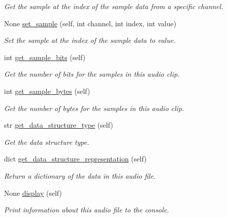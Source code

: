 \begin{DoxyCompactItemize}
\begin{DoxyCompactList}\small\item\em Get the sample at the index of the sample data from a specific channel. \end{DoxyCompactList}\item 
None \mbox{\hyperlink{classbridges_1_1audio__clip_1_1_audio_clip_ae449cf0de308423987bef3ff6b85c50f}{set\+\_\+sample}} (self, int channel, int index, int value)
\begin{DoxyCompactList}\small\item\em Set the sample at the index of the sample data to value. \end{DoxyCompactList}\item 
int \mbox{\hyperlink{classbridges_1_1audio__clip_1_1_audio_clip_a42961560a55008ba85d956f124728984}{get\+\_\+sample\+\_\+bits}} (self)
\begin{DoxyCompactList}\small\item\em Get the number of bits for the samples in this audio clip. \end{DoxyCompactList}\item 
int \mbox{\hyperlink{classbridges_1_1audio__clip_1_1_audio_clip_ab63866904ac833bdcf8b669b90008a64}{get\+\_\+sample\+\_\+bytes}} (self)
\begin{DoxyCompactList}\small\item\em Get the number of bytes for the samples in this audio clip. \end{DoxyCompactList}\item 
str \mbox{\hyperlink{classbridges_1_1audio__clip_1_1_audio_clip_a258ddac138761543fa0ad27496025b12}{get\+\_\+data\+\_\+structure\+\_\+type}} (self)
\begin{DoxyCompactList}\small\item\em Get the data structure type. \end{DoxyCompactList}\item 
dict \mbox{\hyperlink{classbridges_1_1audio__clip_1_1_audio_clip_afed6c31ac64c4dbd892cce7b5abb8ba9}{get\+\_\+data\+\_\+structure\+\_\+representation}} (self)
\begin{DoxyCompactList}\small\item\em Return a dictionary of the data in this audio file. \end{DoxyCompactList}\item 
None \mbox{\hyperlink{classbridges_1_1audio__clip_1_1_audio_clip_a725fd735d019d3103e72fd70ca41017c}{display}} (self)
\begin{DoxyCompactList}\small\item\em Print information about this audio file to the console. \end{DoxyCompactList}\item 

\end{DoxyCompactItemize}
